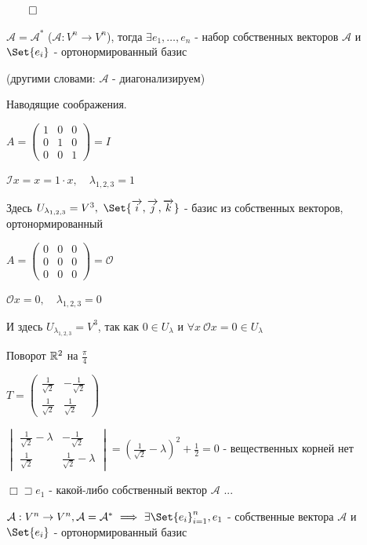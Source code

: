 \documentclass[12pt]{article}
\begin{document}
    $\qed$

    \Th $\mathcal{A} = \mathcal{A}^*$ ($\mathcal{A} : V^n \to V^n$),
    тогда $\exists e_1, \dots, e_n$ - набор собственных векторов $\mathcal{A}$ и $\Set{e_i}$ - ортонормированный базис

    (другими словами: $\mathcal{A}$ - диагонализируем)

    Наводящие соображения.

     $A = \begin{pmatrix}1 & 0 & 0 \\ 0 & 1 & 0 \\ 0 & 0 & 1\end{pmatrix} = I$

    $\mathcal{I}x = x = 1 \cdot x, \quad \lambda_{1,2,3} = 1$

    Здесь $U_{\lambda_{1,2,3}} = V^3, \ \Set{\overrightarrow{i}, \overrightarrow{j}, \overrightarrow{k}}$ - базис из собственных векторов, ортонормированный

     $A = \begin{pmatrix}0 & 0 & 0 \\ 0 & 0 & 0 \\ 0 & 0 & 0\end{pmatrix} = \mathcal{O}$

    $\mathcal{O}x = 0, \quad \lambda_{1,2,3} = 0$

    И здесь $U_{\lambda_{1,2,3}} = V^3$, так как $0 \in U_\lambda$ и $\forall x \ \mathcal{O}x = 0 \in U_\lambda$

     Поворот $\mathbb{R}^2$ на $\frac{\pi}{4}$

    $T = \begin{pmatrix}\frac{1}{\sqrt{2}} & -\frac{1}{\sqrt{2}} \\ \frac{1}{\sqrt{2}} & \frac{1}{\sqrt{2}}\end{pmatrix}$

    $\begin{vmatrix}\frac{1}{\sqrt{2}} - \lambda & -\frac{1}{\sqrt{2}} \\ \frac{1}{\sqrt{2}} & \frac{1}{\sqrt{2}} - \lambda\end{vmatrix} =
    \left(\frac{1}{\sqrt{2}} - \lambda\right)^2 + \frac{1}{2} = 0$ - вещественных корней нет

    $\Box \sqsupset e_1$ - какой-либо собственный вектор $\mathcal{A}$ ...



    \Th $\mathcal{A}: V^n \to V^n, \mathcal{A} = \mathcal{A}^* \ \Longrightarrow \ \exists \Set{e_i}^n_{i=1}, e_1$ -
    собственные вектора $\mathcal{A}$ и $\Set{e_i}$ - ортонормированный базис
\end{document}
